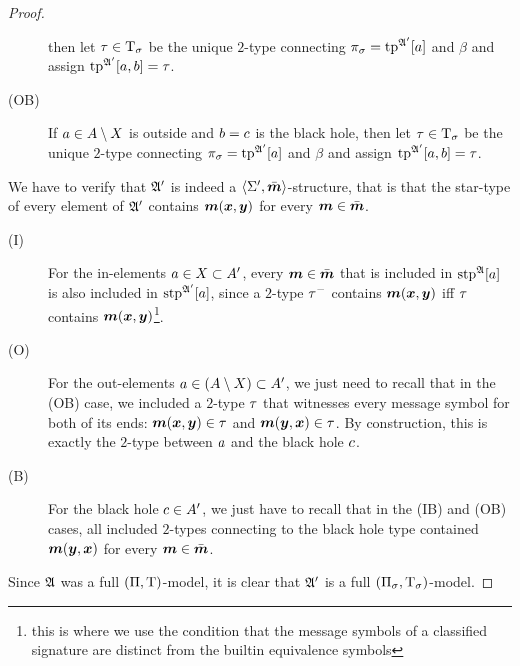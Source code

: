 \begin{proof}
\begin{description}
  then let $\tau \in \mathrm{T}_\sigma$ be the unique $2$-type connecting $\pi_\sigma =
  \operatorname{tp}^{\mathfrak{A'}}[a]$ and $\beta$ and assign $\operatorname{tp}^{\mathfrak{A'}}[a,b] = \tau$.
  \item[(OB)] If $a \in A \setminus X$ is outside and $b = c$ is the
  black hole, then let $\tau \in \mathrm{T}_\sigma$ be the unique $2$-type connecting
  $\pi_\sigma = \operatorname{tp}^{\mathfrak{A'}}[a]$ and $\beta$ and assign $\operatorname{tp}^{\mathfrak{A'}}[a,b] =
  \tau$.
\end{description}
We have to verify that $\mathfrak{A'}$ is indeed a $\left\langle \mathrm{\Sigma'},\bar{\bm{m}} \right\rangle$-structure, that
is that the star-type of every element of $\mathfrak{A'}$ contains $\bm{m}(\bm{x},\bm{y})$ for
every $\bm{m} \in \bar{\bm{m}}$. 
\begin{description}
\item[(I)] For the in-elements $a \in X \subset A'$, every
$\bm{m} \in \bar{\bm{m}}$ that is included in $\operatorname{stp}^{\mathfrak{A}}[a]$ is also included in
$\operatorname{stp}^{\mathfrak{A'}}[a]$, since a $2$-type $\tau^{-}$ contains $\bm{m}(\bm{x},\bm{y})$ iff
$\tau$ contains $\bm{m}(\bm{x},\bm{y})$\footnote{this is where we use the condition
that the message symbols of a classified signature are distinct from the
builtin equivalence symbols}.
\item[(O)] For the out-elements $a \in (A \setminus X) \subset A'$, we
just need to recall that in the (OB) case, we included a $2$-type $\tau$ that
witnesses every message symbol for both of its ends: $\bm{m}(\bm{x},\bm{y}) \in \tau$
and $\bm{m}(\bm{y},\bm{x}) \in \tau$. By construction, this is exactly the $2$-type
between $a$ and the black hole $c$.
\item[(B)] For the black hole $c \in A'$, we just have to recall that in
the (IB) and (OB) cases, all included $2$-types connecting to the black hole
type contained $\bm{m}(\bm{y},\bm{x})$ for every $\bm{m} \in \bar{\bm{m}}$.
\end{description}
Since $\mathfrak{A}$ was a full $(\Pi,\mathrm{T})$-model, it is clear that $\mathfrak{A'}$ is a
full $(\Pi_\sigma,\mathrm{T}_\sigma)$-model.
\end{proof}

